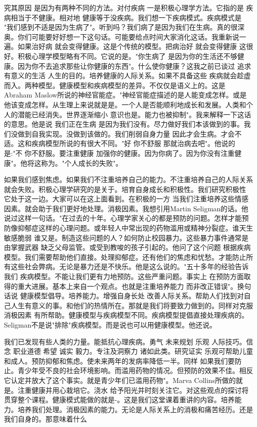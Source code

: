 究其原因 是因为有两种不同的方法。对付疾病 一是积极心理学方法。它指的是 疾病相当于不健康。相对地 健康等于没疾病。我们想一下疾病模式。疾病模式是 "我们感到不适是因为生病了"。听到吗？我们病了是因为我们在生病。真的很深奥。你们可能要好好想一下这句话。可能要给点时间大家消化这话。我重新说一遍。如果治好病 就会变得健康。这是个传统的模型。把病治好 就会变得健康 这很好。积极心理学模型略有不同。它说的是。"你生病了 是因为你的生活还不够健康。因为你不去追求那些让你健康的东西"。什么使你健康？这我之前已谈过 追求有意义的生活 人生的目的。培养健康的人际关系。如果不具备这些 疾病就会趁虚而入。两种模型。健康模型和疾病模型的差异。不仅仅是语义上的。这是Abraham Maslow所说的神经官能症。"神经官能症描述的是人能变成怎样。或是他该变成怎样。从生理上来说就是是。一个人是否能顺利地成长和发展。人类和个人的潜能已经消失。世界逐渐缩小 意识也是。能力也被抑制"。我来解释一下这话的意思。他是说 我们正在生病 是因为我们没有。尽力做好我们本该做到的事。我们没做到自我实现。没做到该做的。我们削弱自身力量 因此才会生病。才会不适。这和疾病模型所说的有很大不同。"好 你不舒服 那就治病去吧"。他说的是:"不 你不舒服。要注重健康 加强你的健康。因为你病了。因为你没有注重健康"。他将这称为。"个人成长的失败"。 

如果我们感到焦虑。如果我们不注重培养自己的能力。不注重培养自己的人际关系 就会失败。积极心理学研究的是关于。培育自身成长和积极性。我们研究积极性 它处于这一边。大家可以在这上面看到。在积极的一方 当我们注重培养这些情感因素。就会助于我们更好地处理。消极因素。我想引用Martin Seligman的话。他说过这样一句话。"在过去的十年。心理学家关心的都是预防的问题。怎样才能预防像抑郁症这样的心理问题。或年轻人中常出现的药物滥用或精神分裂症。谁天生敏感脆弱 谁又是。制造这些问题的人？如何防止校园暴力。这些暴力事件通常是由掌握武器 缺乏父母监管。或受到教唆的孩子引起的。他问了这个问题 根据疾病模型。我们需要帮助他们直接。处理抑郁症。还有他们的焦虑和忧愁。才能防止所有这些社会弊病。无论是暴力还是不快乐。他是这么说的。"五十多年的经验告诉我们 疾病模型。不能让我们更有力地预防。这些严重问题。事实上 在预防方面取得的重大进展。基本上来自一个观点。也就是注重培养能力 而非改正错误"。换句话说 健康模型倡导。培养能力。增强自身长处 改善人际关系。帮助人们找到对自己人生有意义的事。和他们的热情所在。那就是我们将要致力做到的。同样对克服消极因素 有所帮助。健康模型与疾病模型不同。疾病模型提倡直接处理疾病的。Seligman不是说"排除"疾病模型。而是说也可以用健康模型。他还说。 

我们已发现有些人类的力量。能抵抗心理疾病。勇气 未来规划 乐观 人际技巧。信念 职业道德 希望 诚实 毅力。专注及洞察力 诸如此类。研究证实 乐观可帮助儿童和成人。预防抑郁和焦虑。使未来两年的发病率降低一半。同样 如果我们要防止。青少年受不良的社会环境影响。而滥用药物的情况。但预防的效果不佳。相反 它认定并放大了这个事实。就是青少年们已滥用药物"。Marva Collins所做的就是。注重健康并用心栽培它。浇水 给予阳光并时刻关注它。对这些观点的探讨将贯穿整个课程。健康模式能做的就是-。这是我们这堂课着重讲的内容。培养能力。培养我们处理。消极因素的能力。无论是人际关系上的消极和痛苦经历。还是我们自身的。那意味着什么 

